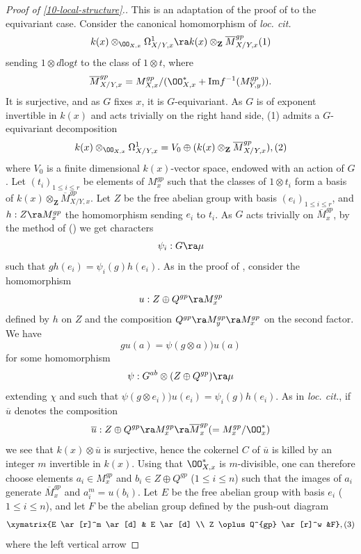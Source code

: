 \documentclass[10pt]{../fichiers-configuration-latex/smfart}
\begin{document}
\begin{proof}[Proof of \ref{10-local-structure}.] This is an adaptation of the proof
of \cite[3.5]{LSFI@Kato} to the equivariant case. Consider the canonical
homomorphism of \textit{loc. cit.} $$ k(x) \otimes_{\OO_{X,x}}
\Omega^1_{X/Y,x} \ra k(x) \otimes_{\mathbf{Z}} \overline{M}^{gp}_{X/Y,x}
\leqno(1) $$ sending $1 \otimes d\mathrm{log}t$ to the class of $1 \otimes
t$, where $$ \overline{M}^{gp}_{X/Y,x} = M^{gp}_{X,x}/(\OO_{X,x}^*
+ \mathrm{Im} f^{-1}(M^{gp}_{Y,y})).  $$ It is surjective, and as $G$ fixes
$x$, it is $G$-equivariant. As $G$ is of exponent invertible in $k(x)$
and acts trivially on the right hand side, (1) admits a $G$-equivariant
decomposition $$ k(x) \otimes_{\OO_{X,x}} \Omega^1_{X/Y,x} = V_0
\oplus( k(x) \otimes_{\mathbf{Z}} \overline{M}^{gp}_{X/Y,x}), \leqno(2)
$$ where $V_0$ is a finite dimensional $k(x)$-vector space, endowed with an
action of $G$. Let $(t_i)_{1 \le i \le r}$ be elements of $M^{gp}_x$ such that
the classes of $1 \otimes t_i$ form a basis of $k(x) \otimes_{\mathbf{Z}}
\overline{M}^{gp}_{X/Y,x}$. Let $Z$ be the free abelian group with basis
$(e_i)_{1 \le i \le r}$, and $h : Z \ra M^{gp}_x$ the homomorphism sending
$e_i$ to $t_i$. As $G$ acts trivially on $\overline{M}^{gp}_x$, by the
method of () we get characters
$$ \psi_i : G \ra \mu $$ such that $gh(e_i) = \psi_i(g)h(e_i)$. As in
the proof of \cite[3.5]{LSFI@Kato}, consider the homomorphism $$ u : Z
\oplus Q^{gp} \ra M^{gp}_x $$ defined by $h$ on $Z$ and the composition
$Q^{gp} \ra M^{gp}_y \ra M^{gp}_x$ on the second factor. We have $$ gu(a)
= \psi(g \otimes a))u(a) $$ for some homomorphism $$ \psi : G^{ab} \otimes
(Z \oplus Q^{gp}) \ra \mu $$ extending $\chi$ and such that $\psi(g \otimes
e_i))u(e_i) = \psi_i(g)h(e_i)$. As in \textit{loc. cit.}, if $\overline{u}$
denotes the composition $$ \overline{u} : Z \oplus Q^{gp} \ra M^{gp}_x \ra
\overline{M}^{gp}_x (= M^{gp}_x/\OO^*_x) $$ we see that $k(x) \otimes
\overline{u}$ is surjective, hence the cokernel $C$ of $\overline{u}$ is killed
by an integer $m$ invertible in $k(x)$. Using that $\OO_{X,x}^*$
is $m$-divisible, one can therefore choose elements $a_i  \in M^{gp}_x$ and
$b_i \in Z \oplus Q^{gp}$ ($1 \le i \le n$) such that the images of $a_i$
generate $\overline{M}^{gp}_x$ and $a_i^m = u(b_i)$. Let $E$ be the free
abelian group with basis $e_i$ ($1 \le i \le n$), and let $F$ be the abelian
group defined by the push-out diagram $$ \xymatrix{E \ar[r]^m \ar[d] & E \ar[d]
\\ Z \oplus Q^{gp} \ar[r]^w &F}, \leqno (3) $$ where the left vertical arrow

\end{proof}
\end{document}
